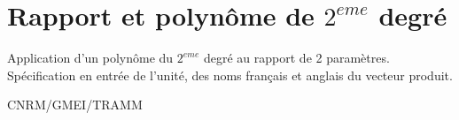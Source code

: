 %
\section{Rapport et polyn\^ome de $2^{eme}$ degr\'e }

 
\label{OP-Poly2_XsurY_flt}

Application d'un polyn\^ome du $2^{eme}$ degr\'e 
au rapport de 2 param\`etres.\\
Sp\'ecification en entr\'ee de l'unit\'e, des noms fran\c cais et
anglais du vecteur produit.

\bigskip





CNRM/GMEI/TRAMM

